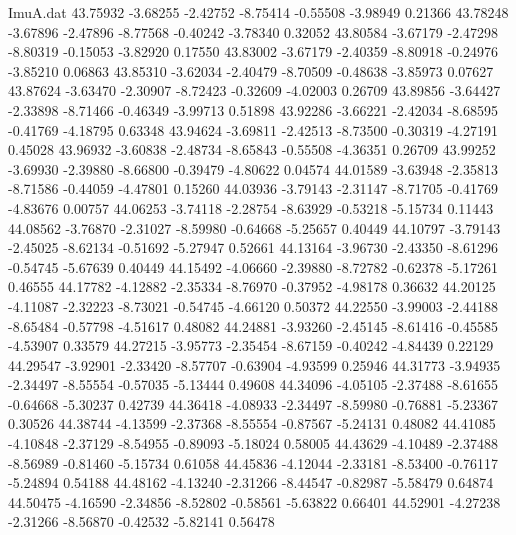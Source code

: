 \begin{filecontents}{ImuA.dat}
  43.75932   -3.68255   -2.42752   -8.75414   -0.55508   -3.98949    0.21366
  43.78248   -3.67896   -2.47896   -8.77568   -0.40242   -3.78340    0.32052
  43.80584   -3.67179   -2.47298   -8.80319   -0.15053   -3.82920    0.17550
  43.83002   -3.67179   -2.40359   -8.80918   -0.24976   -3.85210    0.06863
  43.85310   -3.62034   -2.40479   -8.70509   -0.48638   -3.85973    0.07627
  43.87624   -3.63470   -2.30907   -8.72423   -0.32609   -4.02003    0.26709
  43.89856   -3.64427   -2.33898   -8.71466   -0.46349   -3.99713    0.51898
  43.92286   -3.66221   -2.42034   -8.68595   -0.41769   -4.18795    0.63348
  43.94624   -3.69811   -2.42513   -8.73500   -0.30319   -4.27191    0.45028
  43.96932   -3.60838   -2.48734   -8.65843   -0.55508   -4.36351    0.26709
  43.99252   -3.69930   -2.39880   -8.66800   -0.39479   -4.80622    0.04574
  44.01589   -3.63948   -2.35813   -8.71586   -0.44059   -4.47801    0.15260
  44.03936   -3.79143   -2.31147   -8.71705   -0.41769   -4.83676    0.00757
  44.06253   -3.74118   -2.28754   -8.63929   -0.53218   -5.15734    0.11443
  44.08562   -3.76870   -2.31027   -8.59980   -0.64668   -5.25657    0.40449
  44.10797   -3.79143   -2.45025   -8.62134   -0.51692   -5.27947    0.52661
  44.13164   -3.96730   -2.43350   -8.61296   -0.54745   -5.67639    0.40449
  44.15492   -4.06660   -2.39880   -8.72782   -0.62378   -5.17261    0.46555
  44.17782   -4.12882   -2.35334   -8.76970   -0.37952   -4.98178    0.36632
  44.20125   -4.11087   -2.32223   -8.73021   -0.54745   -4.66120    0.50372
  44.22550   -3.99003   -2.44188   -8.65484   -0.57798   -4.51617    0.48082
  44.24881   -3.93260   -2.45145   -8.61416   -0.45585   -4.53907    0.33579
  44.27215   -3.95773   -2.35454   -8.67159   -0.40242   -4.84439    0.22129
  44.29547   -3.92901   -2.33420   -8.57707   -0.63904   -4.93599    0.25946
  44.31773   -3.94935   -2.34497   -8.55554   -0.57035   -5.13444    0.49608
  44.34096   -4.05105   -2.37488   -8.61655   -0.64668   -5.30237    0.42739
  44.36418   -4.08933   -2.34497   -8.59980   -0.76881   -5.23367    0.30526
  44.38744   -4.13599   -2.37368   -8.55554   -0.87567   -5.24131    0.48082
  44.41085   -4.10848   -2.37129   -8.54955   -0.89093   -5.18024    0.58005
  44.43629   -4.10489   -2.37488   -8.56989   -0.81460   -5.15734    0.61058
  44.45836   -4.12044   -2.33181   -8.53400   -0.76117   -5.24894    0.54188
  44.48162   -4.13240   -2.31266   -8.44547   -0.82987   -5.58479    0.64874
  44.50475   -4.16590   -2.34856   -8.52802   -0.58561   -5.63822    0.66401
  44.52901   -4.27238   -2.31266   -8.56870   -0.42532   -5.82141    0.56478

\end{filecontents}
